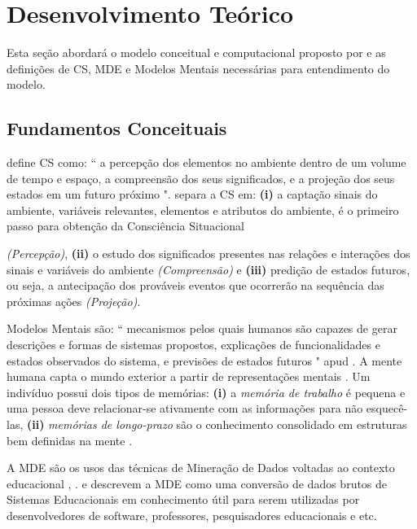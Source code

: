 \documentclass[
	oneside,
	12pt,				%
	a4paper,			%
	english,			%
	brazil,				%
	article
	]{abntex2}
\begin{document}
\section{Desenvolvimento Teórico}

Esta seção abordará o modelo conceitual e computacional proposto por  e as definições de CS, MDE e Modelos Mentais necessárias para entendimento do modelo.

\subsection{Fundamentos Conceituais}

\cite [p. 97]{Endsley1988} define CS como: `` a percepção dos elementos no ambiente dentro de um volume de tempo e espaço, a compreensão dos seus significados, e a projeção dos seus estados em um futuro próximo ".  separa  a CS em: \textbf{(i)} a captação sinais do ambiente, variáveis relevantes, elementos e atributos do ambiente, é o primeiro passo para obtenção da Consciência Situacional {\textit{(Percepção)}, \textbf{(ii)} o estudo dos significados presentes nas relações e interações dos sinais e variáveis do ambiente \textit{(Compreensão)} e \textbf{(iii)} predição de estados futuros, ou seja, a antecipação dos prováveis eventos que ocorrerão na sequência das próximas ações \textit{(Projeção)}.  

Modelos Mentais são: `` mecanismos pelos quais humanos são capazes de gerar descrições e formas de sistemas propostos, explicações de funcionalidades e estados observados do sistema, e previsões de estados futuros " \cite[p.60]{Rouse1985} apud \cite{Endsley1995}. A mente humana capta o mundo exterior a partir de representações mentais \cite{Moreira1996}. Um indivíduo  possui dois tipos de memórias: \textbf{(i)} a \textit{memória de trabalho} é pequena e uma pessoa deve relacionar-se ativamente com as informações para não esquecê-las, \textbf{(ii)} \textit{memórias de longo-prazo} são o conhecimento consolidado em estruturas bem definidas na mente \cite{Endsley2012}.

A MDE são os usos das técnicas de Mineração de Dados voltadas ao contexto educacional \cite{Leite_et_al_2016},  \cite{Romero_Ventura_2013}.  e  descrevem a MDE como uma conversão de dados brutos de Sistemas Educacionais em conhecimento útil para serem utilizadas por desenvolvedores de software, professores, pesquisadores educacionais e etc.

}
\end{document}

